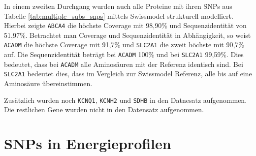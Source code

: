 In einem zweiten Durchgang wurden auch alle Proteine mit ihren SNPs aus Tabelle \ref{tab:multiple_subs_snps} mittels Swissmodel strukturell modelliert. Hierbei zeigte \texttt{ABCA4} die höchste Coverage mit 98,90\% und Sequenzidentität von 51,97\%. Betrachtet man Coverage und Sequenzidentität in Abhängigkeit, so weist \texttt{ACADM} die höchste Coverage mit 91,7\% und \texttt{SLC2A1} die zweit höchste mit 90,7\% auf. Die Sequenzidentität beträgt bei \texttt{ACADM} 100\% und bei \texttt{SLC2A1} 99,59\%. Dies bedeutet, dass bei \texttt{ACADM} alle Aminosäuren mit der Referenz identisch sind. Bei \texttt{SLC2A1} bedeutet dies, dass im Vergleich zur Swissmodel Referenz, alle bis auf eine Aminosäure übereinstimmen.

Zusätzlich wurden noch \texttt{KCNQ1}, \texttt{KCNH2} und \texttt{SDHB} in den Datnesatz aufgenommen. Die restlichen Gene wurden nicht in den Datensatz aufgenommen.



\section{SNPs in Energieprofilen}

